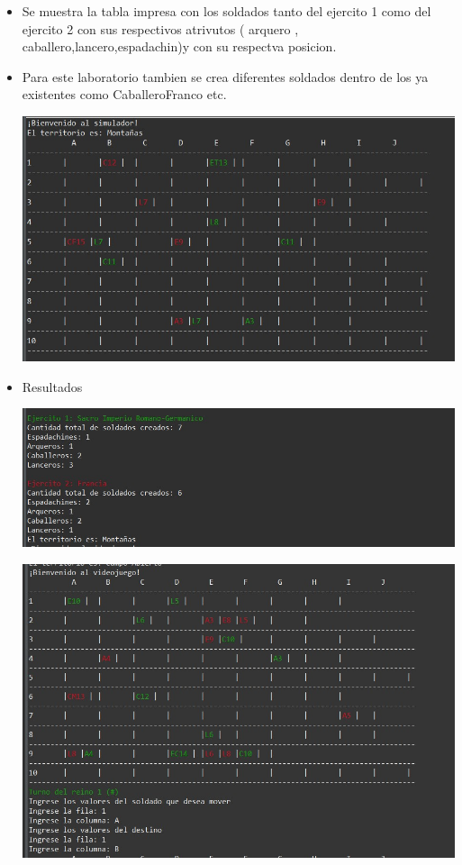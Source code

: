 \documentclass{article}
\begin{document}
	\begin{itemize}	
		\item Se muestra la tabla impresa con los soldados tanto del ejercito 1 como del ejercito 2 con sus respectivos atrivutos ( arquero , caballero,lancero,espadachin)y con su respectva posicion.
		\item Para este laboratorio tambien se crea diferentes soldados dentro de los ya existentes como CaballeroFranco etc.
	
	\includegraphics[scale=0.35]{img/captura1.jpeg} 
\item Resultados

	\includegraphics[scale=0.35]{img/captura2.jpeg} 

	\includegraphics[scale=0.35]{img/captura3.jpeg} 
	


\end{itemize}
\end{document}
